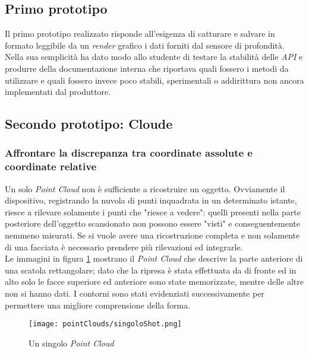\subsection{Primo prototipo}
Il primo prototipo realizzato risponde all'esigenza di catturare e salvare in formato leggibile da un \emph{render} grafico i dati forniti dal sensore di profondità.
Nella sua semplicità ha dato modo allo studente di testare la stabilità delle \emph{API} e produrre della documentazione interna che riportava quali fossero i metodi da utilizzare e quali fossero invece poco stabili, sperimentali o addirittura non ancora implementati dal produttore.

\subsection{Secondo prototipo: Cloude}
\subsubsection{Affrontare la discrepanza tra coordinate assolute e coordinate relative}
Un solo \emph{Point Cloud} non è sufficiente a ricostruire un oggetto. Ovviamente il dispositivo, registrando la nuvola di punti inquadrata in un determinato istante, riesce a rilevare solamente i punti che "riesce a vedere": quelli presenti nella parte posteriore dell'oggetto scansionato non possono essere "visti" e conseguentemente nemmeno misurati. Se si vuole avere una ricostruzione completa e non solamente di una facciata è necessario prendere più rilevazioni ed integrarle.\\
Le immagini in figura \ref{figure:singolo_pointCloud} mostrano il \emph{Point Cloud} che descrive la parte anteriore di una scatola rettangolare; dato che la ripresa è stata effettuata da di fronte ed in alto solo le facce superiore ed anteriore sono state memorizzate, mentre delle altre non si hanno dati. I contorni sono stati evidenziati successivamente per permettere una migliore comprensione della forma.
\begin{figure}[H] 
    \centering 
    \texttt{[image: pointClouds/singoloShot.png]} 
    \caption{Un singolo \emph{Point Cloud}}
    \label{figure:singolo_pointCloud}
\end{figure}
